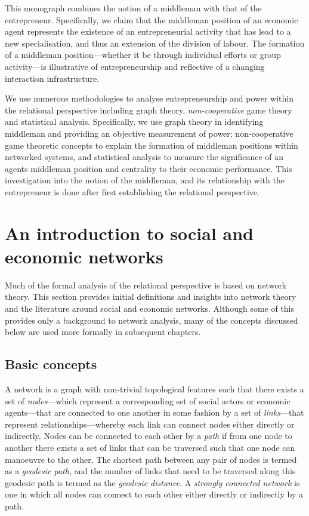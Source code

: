 This monograph combines the notion of a middleman with that of the entrepreneur. Specifically, we claim that the middleman position of an economic agent represents the existence of an entrepreneurial activity that has lead to a new specialisation, and thus an extension of the division of labour. The formation of a middleman position---whether it be through individual efforts or group activity---is illustrative of entrepreneurship and reflective of a changing interaction infrastructure.

We use numerous methodologies to analyse entrepreneurship and power within the relational perspective including graph theory, \emph{non-cooperative} game theory and statistical analysis. Specifically, we use graph theory in identifying middleman and providing an objective measurement of power; non-cooperative game theoretic concepts to explain the formation of middleman positions within networked systems, and statistical analysis to measure the significance of an agents middleman position and centrality to their economic performance. This investigation into the notion of the middleman, and its relationship with the entrepreneur is done after first establishing the relational perspective.

\section{An introduction to social and economic networks}
\label{sec:socialeconomicnetworks}

Much of the formal analysis of the relational perspective is based on network theory. This section provides initial definitions and insights into network theory and the literature around social and economic networks. Although some of this provides only a background to network analysis, many of the concepts discussed below are used more formally in subsequent chapters.

\subsection{Basic concepts}

A network is a graph with non-trivial topological features such that there exists a set of \emph{nodes}---which represent a corresponding set of social actors or economic agents---that are connected to one another in some fashion by a set of \emph{links}---that represent relationships---whereby each link can connect nodes either directly or indirectly. Nodes can be connected to each other by a \emph{path} if from one node to another there exists a set of links that can be traversed such that one node can manoeuvre to the other. The shortest path between any pair of nodes is termed as a \emph{geodesic path}, and the number of links that need to be traversed along this geodesic path is termed as the \emph{geodesic distance}. A \emph{strongly connected network} is one in which all nodes can connect to each other either directly or indirectly by a path.

